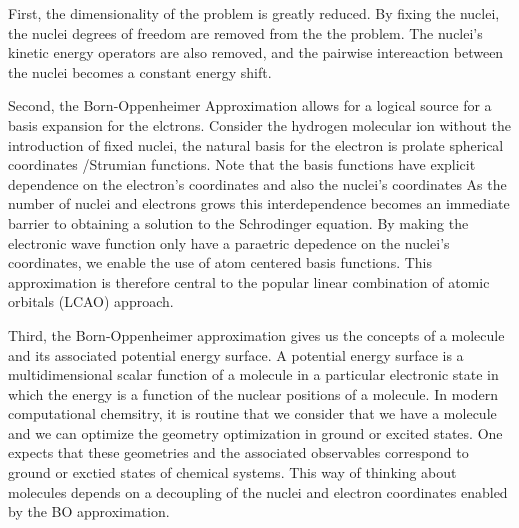 First, the dimensionality of the problem is greatly reduced.
By fixing the nuclei, the nuclei degrees of freedom are removed from the the problem.
The nuclei's kinetic energy operators are also removed, and the pairwise intereaction between the nuclei becomes a constant energy shift.

Second, the Born-Oppenheimer Approximation allows for a logical source for a basis expansion for the elctrons.
Consider the hydrogen molecular ion without the introduction of fixed nuclei, the natural basis for the electron is prolate spherical coordinates /Strumian functions.
Note that the basis functions have explicit dependence on the electron's coordinates and also the nuclei's coordinates
As the number of nuclei and electrons grows this interdependence becomes an immediate barrier to obtaining a solution to the Schrodinger equation.
By making the electronic wave function only have a paraetric depedence on the nuclei's coordinates, we enable the use of atom centered basis functions.
This approximation is therefore central to the popular linear combination of atomic orbitals (LCAO) approach.

Third, the Born-Oppenheimer approximation gives us the concepts of a molecule and its associated potential energy surface.
A potential energy surface is a multidimensional scalar function of a molecule in a particular electronic state in which the energy is a function of the nuclear positions of a molecule.
In modern computational chemsitry, it is routine that we consider that we have a molecule and we can optimize the geometry optimization in ground or excited states.
One expects that these geometries and the associated observables correspond to ground or exctied states of chemical systems.
This way of thinking about molecules depends on a decoupling of the nuclei and electron coordinates enabled by the BO approximation.
